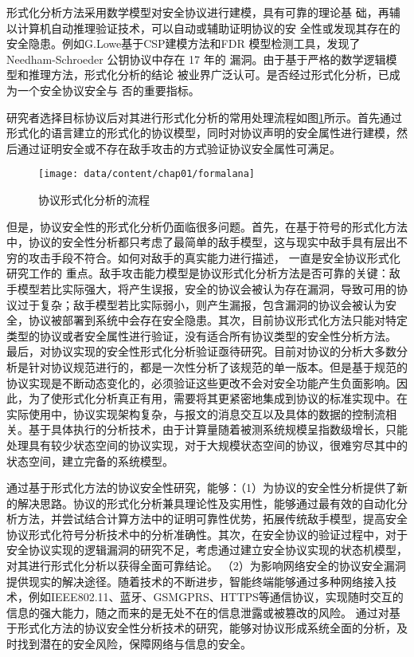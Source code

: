 形式化分析方法采用数学模型对安全协议进行建模，具有可靠的理论基
础，再辅以计算机自动推理验证技术，可以自动或辅助证明协议的安
全性或发现其存在的安全隐患。例如G.Lowe基于CSP建模方法和FDR
模型检测工具，发现了 Needham-Schroeder 公钥协议中存在 17 年的
漏洞。由于基于严格的数学逻辑模型和推理方法，形式化分析的结论
被业界广泛认可。是否经过形式化分析，已成为一个安全协议安全与
否的重要指标。

研究者选择目标协议后对其进行形式化分析的常用处理流程如图\ref{fig-formalanalyse}所示。首先通过形式化的语言建立的形式化的协议模型，同时对协议声明的安全属性进行建模，然后通过证明安全或不存在敌手攻击的方式验证协议安全属性可满足。

\begin{figure}[htp]
\centering\texttt{[image: data/content/chap01/formalana]}
\caption{协议形式化分析的流程}
\label{fig-formalanalyse}
\end{figure}


但是，协议安全性的形式化分析仍面临很多问题。首先，在基于符号的形式化方法中，协议的安全性分析都只考虑了最简单的敌手模型，这与现实中敌手具有层出不穷的攻击手段不符合。如何对敌手的真实能力进行描述， 一直是安全协议形式化研究工作的
重点。敌手攻击能力模型是协议形式化分析方法是否可靠的关键：敌手模型若比实际强大，将产生误报，安全的协议会被认为存在漏洞，导致可用的协议过于复杂；敌手模型若比实际弱小，则产生漏报，包含漏洞的协议会被认为安全，协议被部署到系统中会存在安全隐患。其次，目前协议形式化方法只能对特定类型的协议或者安全属性进行验证，没有适合所有协议类型的安全性分析方法。
最后，对协议实现的安全性形式化分析验证亟待研究。目前对协议的分析大多数分析是针对协议规范进行的，都是一次性分析了该规范的单一版本。但是基于规范的协议实现是不断动态变化的，必须验证这些更改不会对安全功能产生负面影响。因此，为了使形式化分析真正有用，需要将其更紧密地集成到协议的标准实现中。在实际使用中，协议实现架构复杂，与报文的消息交互以及具体的数据的控制流相关。基于具体执行的分析技术，由于计算量随着被测系统规模呈指数级增长，只能处理具有较少状态空间的协议实现，对于大规模状态空间的协议，很难穷尽其中的状态空间，建立完备的系统模型。

通过基于形式化方法的协议安全性研究，能够：（1）为协议的安全性分析提供了新的解决思路。协议的形式化分析兼具理论性及实用性，能够通过最有效的自动化分析方法，并尝试结合计算方法中的证明可靠性优势，拓展传统敌手模型，提高安全协议形式化符号分析技术中的分析准确性。其次，在安全协议的验证过程中，对于安全协议实现的逻辑漏洞的研究不足，考虑通过建立安全协议实现的状态机模型，对其进行形式化分析以获得全面可靠结论。
（2）为影响网络安全的协议安全漏洞提供现实的解决途径。随着技术的不断进步，智能终端能够通过多种网络接入技术，例如IEEE802.11、蓝牙、GSMGPRS、HTTPS等通信协议，实现随时交互的信息的强大能力，随之而来的是无处不在的信息泄露或被篡改的风险。 通过对基于形式化方法的协议安全性分析技术的研究，能够对协议形成系统全面的分析，及时找到潜在的安全风险，保障网络与信息的安全。









